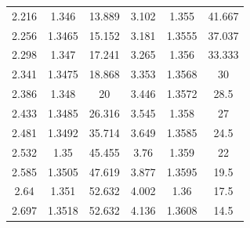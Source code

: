 \documentclass{book}
\begin{document}
\begin{table}[h]
\begin{tabular}{c c c | c c c}
2.216                     & 1.346                    & 13.889                    & 3.102                     & 1.355                    & 41.667                    \\
2.256                     & 1.3465                   & 15.152                    & 3.181                     & 1.3555                   & 37.037                    \\
2.298                     & 1.347                    & 17.241                    & 3.265                     & 1.356                    & 33.333                    \\
2.341                     & 1.3475                   & 18.868                    & 3.353                     & 1.3568                   & 30                        \\
2.386                     & 1.348                    & 20                        & 3.446                     & 1.3572                   & 28.5                      \\
2.433                     & 1.3485                   & 26.316                    & 3.545                     & 1.358                    & 27                        \\
2.481                     & 1.3492                   & 35.714                    & 3.649                     & 1.3585                   & 24.5                      \\
2.532                     & 1.35                     & 45.455                    & 3.76                      & 1.359                    & 22                        \\
2.585                     & 1.3505                   & 47.619                    & 3.877                     & 1.3595                   & 19.5                      \\
2.64                      & 1.351                    & 52.632                    & 4.002                     & 1.36                     & 17.5                      \\
2.697                     & 1.3518                   & 52.632                    & 4.136                     & 1.3608                   & 14.5 \\

 \hline
\hline

\hline
\end{tabular}
\end{table}
\end{document}
